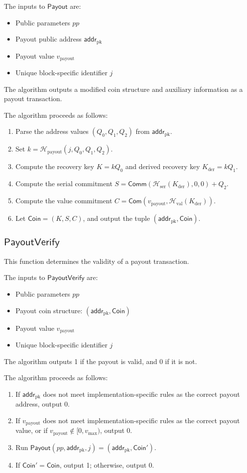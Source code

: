 \documentclass{article}
\newcommand{\func}[1]{\mathsf{#1}}
\newcommand{\com}{\func{Com}}
\newcommand{\comm}{\func{Comm}}
\newcommand{\addr}{\func{addr}}
\newcommand{\hash}{\mathcal{H}}
\theoremstyle{remark}
\begin{document}
The inputs to $\func{Payout}$ are:
\begin{itemize}
    \item Public parameters $pp$
    \item Payout public address $\addr_{\text{pk}}$
    \item Payout value $v_{\text{payout}}$
    \item Unique block-specific identifier $j$
\end{itemize}
The algorithm outputs a modified coin structure and auxiliary information as a payout transaction.

The algorithm proceeds as follows:
\begin{enumerate}
    \item Parse the address values $(Q_0,Q_1,Q_2)$ from $\addr_{\text{pk}}$.
    \item Set $k = \hash_{\text{payout}}(j,Q_0,Q_1,Q_2)$.
    \item Compute the recovery key $K = kQ_0$ and derived recovery key $K_{\text{der}} = kQ_1$.
    \item Compute the serial commitment $S = \comm(\hash_{\text{ser}}(K_{\text{der}}),0,0) + Q_2$.
    \item Compute the value commitment $C = \com(v_{\text{payout}},\hash_{\text{val}}(K_{\text{der}}))$.
    \item Let $\func{Coin} = (K,S,C)$, and output the tuple $(\addr_{\text{pk}},\func{Coin})$.
\end{enumerate}


\subsection{\texorpdfstring{$\func{PayoutVerify}$}{PayoutVerify}}

This function determines the validity of a payout transaction.

The inputs to $\func{PayoutVerify}$ are:
\begin{itemize}
    \item Public parameters $pp$
    \item Payout coin structure: $(\addr_{\text{pk}},\func{Coin})$
    \item Payout value $v_{\text{payout}}$
    \item Unique block-specific identifier $j$
\end{itemize}
The algorithm outputs 1 if the payout is valid, and 0 if it is not.

The algorithm proceeds as follows:
\begin{enumerate}
    \item If $\addr_{\text{pk}}$ does not meet implementation-specific rules as the correct payout address, output 0.
    \item If $v_{\text{payout}}$ does not meet implementation-specific rules as the correct payout value, or if $v_{\text{payout}} \not\in [0,v_{\text{max}})$, output 0.
    \item Run $\func{Payout}(pp,\addr_{\text{pk}},j) = (\addr_{\text{pk}},\func{Coin}')$.
    \item If $\func{Coin}' = \func{Coin}$, output 1; otherwise, output 0.
\end{enumerate}
\end{document}
